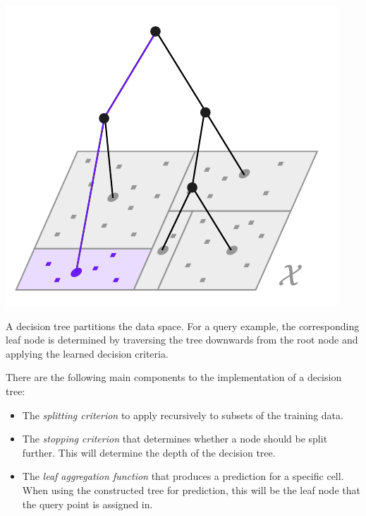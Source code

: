 \documentclass[../main.tex]{subfiles}
\begin{document}
\begin{marginfigure}
    \includegraphics[width=\textwidth]{figma-illustrations/tree-partition.pdf}
    \label{fig:tree-partition}
    \caption{A decision tree partitions the data space. For a query example, the corresponding leaf node is determined by traversing the tree downwards from the root node and applying the learned decision criteria.}
\end{marginfigure}


    

There are the following main components to the implementation of a decision tree:
\begin{itemize}
    \item The \textit{splitting criterion} to apply recursively to subsets of the training data.
    \item The \textit{stopping criterion} that determines whether a node should be split further. This will determine the depth of the decision tree.
    \item The \textit{leaf aggregation function} that produces a prediction for a specific cell. When using the constructed tree for prediction, this will be the leaf node that the query point is assigned in.
\end{itemize}
\end{document}
